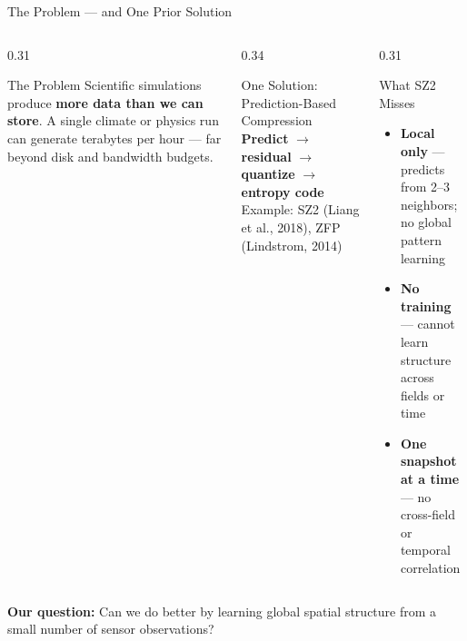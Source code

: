 \documentclass[aspectratio=169, 11pt]{beamer}
\begin{document}
\begin{frame}{The Problem — and One Prior Solution}
\begin{columns}[T]

  \begin{column}{0.31\textwidth}
    \begingroup
    \begin{block}{The Problem}
      \footnotesize
      Scientific simulations produce \textbf{more data than we can store}.
      A single climate or physics run can generate terabytes per hour —
      far beyond disk and bandwidth budgets.
    \end{block}
    \endgroup
  \end{column}

  \begin{column}{0.34\textwidth}
    \begingroup
    \begin{block}{One Solution: Prediction-Based Compression}
      \footnotesize
      \textbf{Predict} $\to$ \textbf{residual} $\to$ \textbf{quantize}
      $\to$ \textbf{entropy code}\\[0.3em]
      Example: SZ2 (Liang et al., 2018), ZFP (Lindstrom, 2014)\\[0.2em]
    \end{block}
    \endgroup
  \end{column}

  \begin{column}{0.31\textwidth}
    \begingroup
    \begin{block}{What SZ2 Misses}
      \footnotesize
      \begin{itemize}\setlength\itemsep{0.2em}
        \item \textbf{Local only} — predicts from 2–3 neighbors; no global pattern learning
        \item \textbf{No training} — cannot learn structure across fields or time
        \item \textbf{One snapshot at a time} — no cross-field or temporal correlation
      \end{itemize}
    \end{block}
    \endgroup
  \end{column}

\end{columns}

\vspace{0.4em}
{\footnotesize\color{cmuted}
  \textbf{Our question:} Can we do better by learning global spatial structure
  from a small number of sensor observations?
}
\end{frame}
\end{document}

